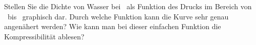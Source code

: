 Stellen Sie die Dichte von Wasser bei \TwO\ als Funktion des Drucks im Bereich von \pwaO\ bis \pwbO\ graphisch dar. Durch welche Funktion kann die Kurve sehr genau angenähert werden? Wie kann man bei dieser einfachen Funktion die Kompressibilität ablesen?
